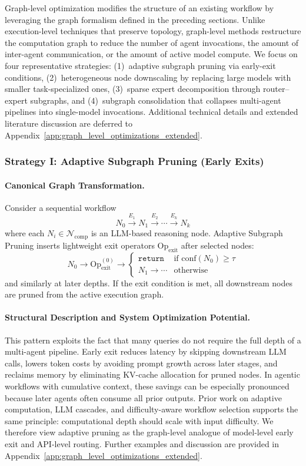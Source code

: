 Graph-level optimization modifies the structure of an existing workflow by leveraging the graph formalism defined in the preceding sections. Unlike execution-level techniques that preserve topology, graph-level methods restructure the computation graph to reduce the number of agent invocations, the amount of inter-agent communication, or the amount of active model compute. We focus on four representative strategies: (1)~adaptive subgraph pruning via early-exit conditions, (2)~heterogeneous node downscaling by replacing large models with smaller task-specialized ones, (3)~sparse expert decomposition through router--expert subgraphs, and (4)~subgraph consolidation that collapses multi-agent pipelines into single-model invocations. Additional technical details and extended literature discussion are deferred to Appendix~\ref{app:graph_level_optimizations_extended}.

\subsubsection{Strategy I: Adaptive Subgraph Pruning (Early Exits)}

\paragraph{Canonical Graph Transformation.}
Consider a sequential workflow
\[
N_0 \xrightarrow{E_1} N_1 \xrightarrow{E_2} \cdots \xrightarrow{E_k} N_k
\]
where each $N_i \in \mathcal{N}_{\text{comp}}$ is an LLM-based reasoning node. Adaptive Subgraph Pruning inserts lightweight exit operators $\text{Op}_{\text{exit}}$ after selected nodes:
\[
N_0 \rightarrow \text{Op}_{\text{exit}}^{(0)} \rightarrow
\left\{
\begin{array}{ll}
\texttt{return} & \text{if } \text{conf}(N_0) \geq \tau \\
N_1 \rightarrow \cdots & \text{otherwise}
\end{array}
\right.
\]
and similarly at later depths. If the exit condition is met, all downstream nodes are pruned from the active execution graph.

\paragraph{Structural Description and System Optimization Potential.}
This pattern exploits the fact that many queries do not require the full depth of a multi-agent pipeline. Early exit reduces latency by skipping downstream LLM calls, lowers token costs by avoiding prompt growth across later stages, and reclaims memory by eliminating KV-cache allocation for pruned nodes. In agentic workflows with cumulative context, these savings can be especially pronounced because later agents often consume all prior outputs. Prior work on adaptive computation, LLM cascades, and difficulty-aware workflow selection supports the same principle: computational depth should scale with input difficulty. We therefore view adaptive pruning as the graph-level analogue of model-level early exit and API-level routing. Further examples and discussion are provided in Appendix~\ref{app:graph_level_optimizations_extended}.

